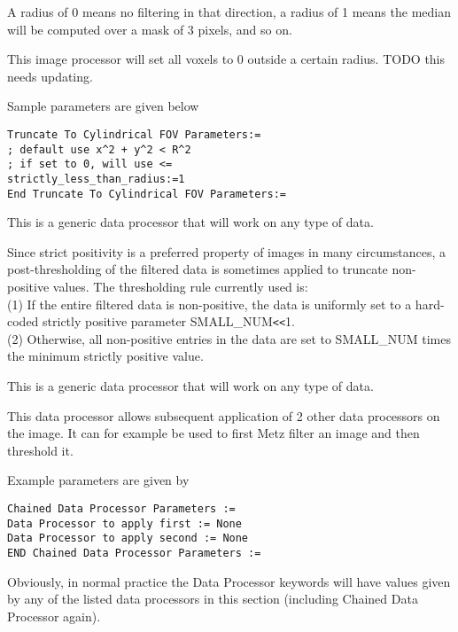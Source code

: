 \documentclass{article}
\newcommand{\tab}{\hspace{5mm}}
\begin{document}
A radius of 0 means no filtering in that direction, a radius 
of 1 means the median will be computed over a mask of 3 pixels, 
and so on.


{ 
}
This image processor will set all voxels to 0 outside a certain radius.
TODO this needs updating.
{ 
}

Sample parameters are given below

\begin{verbatim}
Truncate To Cylindrical FOV Parameters:=
; default use x^2 + y^2 < R^2
; if set to 0, will use <=
strictly_less_than_radius:=1 
End Truncate To Cylindrical FOV Parameters:=
\end{verbatim}

{ 
}
This is a generic data processor that will work on any type of data.

Since strict positivity is a preferred property of images in 
many circumstances, a post-thresholding of the filtered data 
is sometimes applied to truncate non-positive values. The thresholding 
rule currently used is:\\
(1)\tab 
If the entire filtered data is non-positive, the data is uniformly 
set to a hard-coded strictly positive parameter SMALL\_NUM\texttt{<}\texttt{<}1.\\
(2)\tab 
Otherwise, all non-positive entries in the data are set to SMALL\_NUM 
times the minimum strictly positive value.


{ 
}
This is a generic data processor that will work on any type of data.

This data processor allows subsequent application of 2 other 
data processors on the image. It can for example be used to 
first Metz filter an image and then threshold it.

{ 
}

Example parameters are given by

\begin{verbatim}
Chained Data Processor Parameters :=
Data Processor to apply first := None
Data Processor to apply second := None
END Chained Data Processor Parameters :=
\end{verbatim}

Obviously, in normal practice the Data Processor keywords will 
have values given by any of the listed data processors in this 
section (including Chained Data Processor again).
\end{document}
